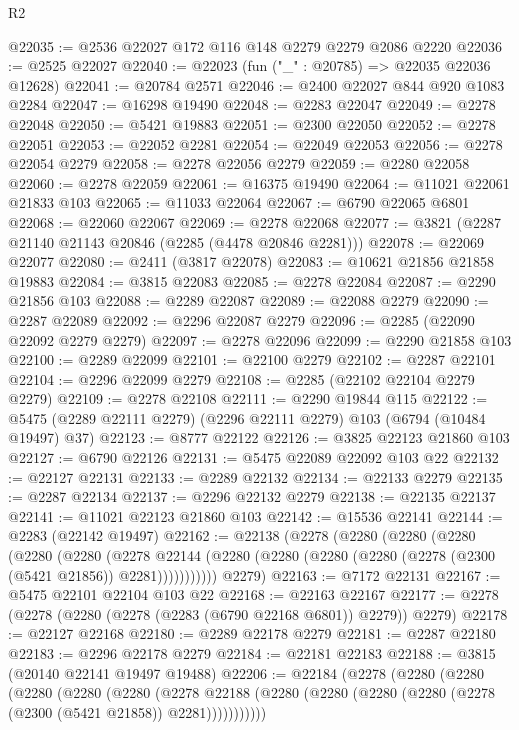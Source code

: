 \begin{lexlean}{R2}
\begin{coremodule}
@22035 := @2536 @22027 @172 @116 @148 @2279 @2279 @2086 @2220
@22036 := @2525 @22027
@22040 := @22023 (fun ("_" : @20785) => @22035 @22036 @12628)
@22041 := @20784 @2571
@22046 := @2400 @22027 @844 @920 @1083 @2284
@22047 := @16298 @19490
@22048 := @2283 @22047
@22049 := @2278 @22048
@22050 := @5421 @19883
@22051 := @2300 @22050
@22052 := @2278 @22051
@22053 := @22052 @2281
@22054 := @22049 @22053
@22056 := @2278 @22054 @2279
@22058 := @2278 @22056 @2279
@22059 := @2280 @22058
@22060 := @2278 @22059
@22061 := @16375 @19490
@22064 := @11021 @22061 @21833 @103
@22065 := @11033 @22064
@22067 := @6790 @22065 @6801
@22068 := @22060 @22067
@22069 := @2278 @22068
@22077 := @3821 (@2287 @21140 @21143 @20846 (@2285 (@4478 @20846 @2281)))
@22078 := @22069 @22077
@22080 := @2411 (@3817 @22078)
@22083 := @10621 @21856 @21858 @19883
@22084 := @3815 @22083
@22085 := @2278 @22084
@22087 := @2290 @21856 @103
@22088 := @2289 @22087
@22089 := @22088 @2279
@22090 := @2287 @22089
@22092 := @2296 @22087 @2279
@22096 := @2285 (@22090 @22092 @2279 @2279)
@22097 := @2278 @22096
@22099 := @2290 @21858 @103
@22100 := @2289 @22099
@22101 := @22100 @2279
@22102 := @2287 @22101
@22104 := @2296 @22099 @2279
@22108 := @2285 (@22102 @22104 @2279 @2279)
@22109 := @2278 @22108
@22111 := @2290 @19844 @115
@22122 := @5475 (@2289 @22111 @2279) (@2296 @22111 @2279) @103 (@6794 (@10484 @19497) @37)
@22123 := @8777 @22122
@22126 := @3825 @22123 @21860 @103
@22127 := @6790 @22126
@22131 := @5475 @22089 @22092 @103 @22
@22132 := @22127 @22131
@22133 := @2289 @22132
@22134 := @22133 @2279
@22135 := @2287 @22134
@22137 := @2296 @22132 @2279
@22138 := @22135 @22137
@22141 := @11021 @22123 @21860 @103
@22142 := @15536 @22141
@22144 := @2283 (@22142 @19497)
@22162 := @22138
    (@2278
      (@2280
        (@2280
          (@2280
            (@2280
              (@2280
                (@2278
                  @22144
                  (@2280 (@2280 (@2280 (@2280 (@2278 (@2300 (@5421 @21856)) @2281)))))))))))
      @2279)
@22163 := @7172 @22131
@22167 := @5475 @22101 @22104 @103 @22
@22168 := @22163 @22167
@22177 := @2278 (@2278 (@2280 (@2278 (@2283 (@6790 @22168 @6801)) @2279)) @2279)
@22178 := @22127 @22168
@22180 := @2289 @22178 @2279
@22181 := @2287 @22180
@22183 := @2296 @22178 @2279
@22184 := @22181 @22183
@22188 := @3815 (@20140 @22141 @19497 @19488)
@22206 := @22184
    (@2278
      (@2280
        (@2280
          (@2280
            (@2280
              (@2280
                (@2278
                  @22188
                  (@2280 (@2280 (@2280 (@2280 (@2278 (@2300 (@5421 @21858)) @2281)))))))))))

\end{coremodule}
\end{lexlean}
